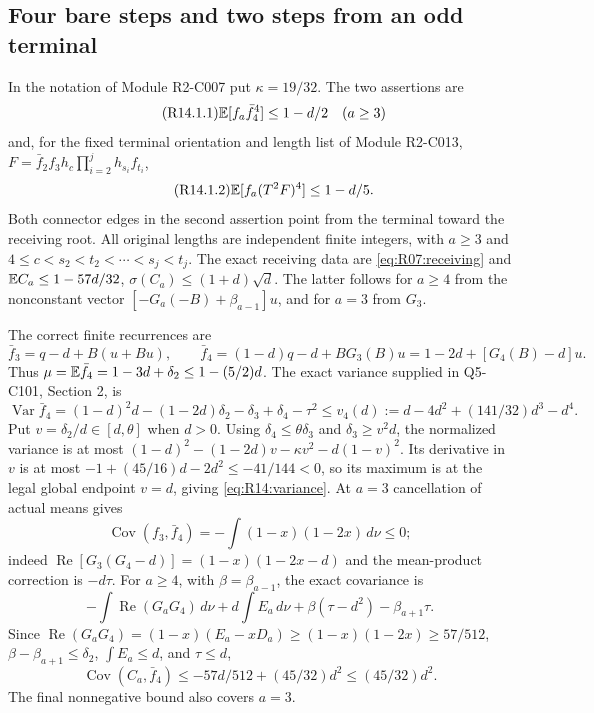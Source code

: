 \subsection{Four bare steps and two steps from an odd terminal}\label{proof:R2-C014}
In the notation of Module R2-C007 put $\kappa=19/32$.
The two assertions are
\begin{equation}\tag{R14.1.1}\label{eq:R14:bare}
 \mathbb E[f_a\bar f_4^4]\le1-d/2\quad(a\ge3)
\end{equation}
and, for the fixed terminal orientation and length list of Module
R2-C013, $F=\bar f_2f_3h_c\prod_{i=2}^jh_{s_i}f_{t_i}$,
\begin{equation}\tag{R14.1.2}\label{eq:R14:terminal}
 \mathbb E[f_a(T^2F)^4]\le1-d/5.
\end{equation}
Both connector edges in the second assertion point from the terminal
toward the receiving root. All original lengths are independent finite
integers, with $a\ge3$ and $4\le c<s_2<t_2<\cdots<s_j<t_j$.
The exact receiving data are \eqref{eq:R07:receiving} and
$\mathbb E C_a\le1-57d/32$, $\sigma(C_a)\le(1+d)\sqrt d$.
The latter follows for $a\ge4$ from the nonconstant vector
$[-G_a(-B)+\beta_{a-1}]u$, and for $a=3$ from $G_3$.

The correct finite recurrences are
\begin{equation}\tag{R14.2.1}\label{eq:R14:recurrence}
\bar f_3=q-d+B(u+Bu),\qquad
\bar f_4=(1-d)q-d+BG_3(B)u
=1-2d+[G_4(B)-d]u.
\end{equation}
Thus $\mu=\mathbb E\bar f_4=1-3d+\delta_2\le1-(5/2)d$.
The exact variance supplied in Q5-C101, Section 2, is
\begin{equation}\tag{R14.2.2}\label{eq:R14:variance}
\operatorname{Var}\bar f_4
=(1-d)^2d-(1-2d)\delta_2-\delta_3+\delta_4-\tau^2
\le v_4(d):=d-4d^2+(141/32)d^3-d^4.
\end{equation}
Put $v=\delta_2/d\in[d,\theta]$ when $d>0$.
Using $\delta_4\le\theta\delta_3$ and $\delta_3\ge v^2d$, the
normalized variance is at most
$(1-d)^2-(1-2d)v-\kappa v^2-d(1-v)^2$.
Its derivative in $v$ is at most
$-1+(45/16)d-2d^2\le-41/144<0$, so its maximum is at the legal
global endpoint $v=d$, giving \eqref{eq:R14:variance}.
At $a=3$ cancellation of actual means gives
\[
\operatorname{Cov}(f_3,\bar f_4)
=-\int(1-x)(1-2x)\,d\nu\le0;
\]
indeed $\operatorname{Re}[G_3(G_4-d)]=(1-x)(1-2x-d)$ and the
mean-product correction is $-d\tau$.
For $a\ge4$, with $\beta=\beta_{a-1}$, the exact covariance is
\[
-\int\operatorname{Re}(G_aG_4)\,d\nu+d\int E_a\,d\nu
+\beta(\tau-d^2)-\beta_{a+1}\tau.
\]
Since $\operatorname{Re}(G_aG_4)=(1-x)(E_a-xD_a)
\ge(1-x)(1-2x)\ge57/512$,
$\beta-\beta_{a+1}\le\delta_2$, $\int E_a\le d$, and $\tau\le d$,
\begin{equation}\tag{R14.2.4}\label{eq:R14:covariance}
\operatorname{Cov}(C_a,\bar f_4)
\le-57d/512+(45/32)d^2\le(45/32)d^2.
\end{equation}
The final nonnegative bound also covers $a=3$.

